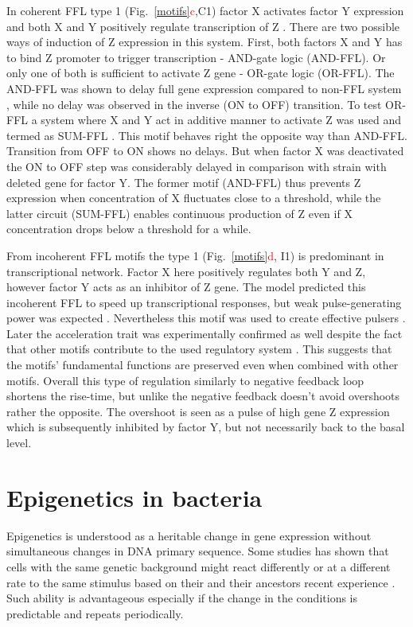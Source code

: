 In coherent FFL type 1 (Fig.~\ref{motifs}\textcolor{red}{c},C1) factor X activates factor Y expression and both X and Y positively regulate transcription of Z \cite{mangan2003structure}.
There are two possible ways of induction of Z expression in this system.
First, both factors X and Y has to bind Z promoter to trigger transcription - AND-gate logic (AND-FFL).
Or only one of both is sufficient to activate Z gene - OR-gate logic (OR-FFL).
The AND-FFL was shown to delay full gene expression compared to non-FFL system \cite{mangan2003coherent}, while no delay was observed in the inverse (ON to OFF) transition.
To test OR-FFL a system where X and Y act in additive manner to activate Z was used and termed as SUM-FFL \cite{kalir2005coherent}.
This motif behaves right the opposite way than AND-FFL.
Transition from OFF to ON shows no delays.
But when factor X was deactivated the ON to OFF step was considerably delayed in comparison with strain with deleted gene for factor Y.
The former motif (AND-FFL) thus prevents Z expression when concentration of X fluctuates close to a threshold, while the latter circuit (SUM-FFL) enables continuous production of Z even if X concentration drops below a threshold for a while.

From incoherent FFL motifs the type 1 (Fig.~\ref{motifs}\textcolor{red}{d}, I1) is predominant in  transcriptional network.
Factor X here positively regulates both Y and Z, however factor Y acts as an inhibitor of Z gene.
The model predicted this incoherent FFL to speed up transcriptional responses, but weak pulse-generating power was expected \cite{mangan2003structure}.
Nevertheless this motif was used to create effective pulsers \cite{basu2004spatiotemporal}.
Later the acceleration trait was experimentally confirmed as well despite the fact that other motifs contribute to the used regulatory system \cite{mangan2006incoherent}.
This suggests that the motifs' fundamental functions are preserved even when combined with other motifs.
Overall this type of regulation similarly to negative feedback loop shortens the rise-time, but unlike the negative feedback doesn't avoid overshoots rather the opposite.
The overshoot is seen as a pulse of high gene Z expression which is subsequently inhibited by factor Y, but not necessarily back to the basal level.


\section{Epigenetics in bacteria}
Epigenetics is understood as a heritable change in gene expression without simultaneous changes in DNA primary sequence.
Some studies has shown that cells with the same genetic background might react differently or at a different rate to the same stimulus based on their and their ancestors recent experience \cite{mathis2017asymmetric, ronin2017long}.
Such ability is advantageous especially if the change in the conditions is predictable and repeats periodically.

